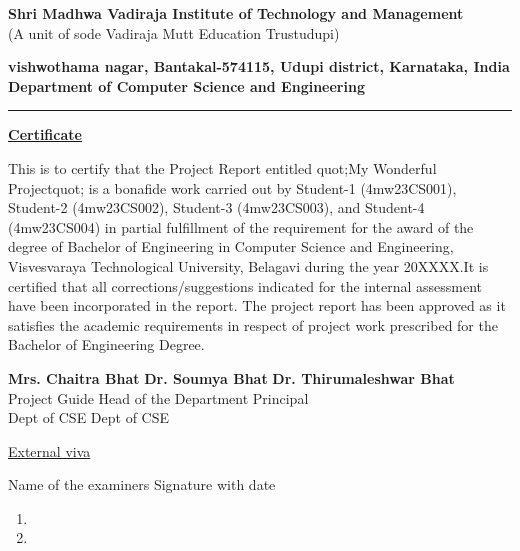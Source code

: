 \documentclass[12pt, a4paper]{report}
\begin{document}
\thispagestyle{empty}
\begin{mdframed}[linewidth=1pt]
\begin{center}
\textbf{Shri Madhwa Vadiraja Institute of Technology and Management}\\
\vspace{0.1cm}
{\small (A unit of sode Vadiraja Mutt Education Trust\textregistered udupi)}
\vspace{0.1cm}

\textbf{vishwothama nagar, Bantakal-574115, Udupi district, Karnataka, India}\\
\vspace{0.1cm}
\textbf{Department of Computer Science and Engineering}
\vspace{0.2cm}
\rule{15cm}{0.1mm}

\textbf{\large \underline{Certificate}}\\
\end{center}
\justify
This is to certify that the Project Report entitled quot;My Wonderful Projectquot; is a bonafide work carried out by Student-1 (4mw23CS001), Student-2 (4mw23CS002), Student-3 (4mw23CS003), and Student-4 (4mw23CS004) in partial fulfillment of the requirement for the award of the degree of Bachelor of Engineering in Computer Science and Engineering, Visvesvaraya Technological University, Belagavi during the year 20XXXX.It is certified that all corrections/suggestions indicated for the internal assessment have been incorporated in the report. The project report has been approved as it satisfies the academic requirements in respect of project work prescribed for the Bachelor of Engineering Degree.
\vspace{4cm}
\vfill
\begin{tabbing}
\textbf{\footnotesize Mrs. Chaitra Bhat} \hspace{2cm}\=  
\textbf{\footnotesize Dr. Soumya Bhat} \hspace{2cm}\=
\textbf{\footnotesize Dr. Thirumaleshwar Bhat} \\

\footnotesize Project Guide \> Head of the Department \> Principal \\
\footnotesize Dept of CSE \> Dept of CSE\> \\

\end{tabbing}

\vspace{1cm}
\begin{center}
\underline{External viva}\\
\end{center}
\noindent Name of the examiners \hfill Signature with date\\
\begin{small}
\begin{enumerate}
\item
\item
\end{enumerate}
\end{small}

\end{mdframed}
\end{document}
